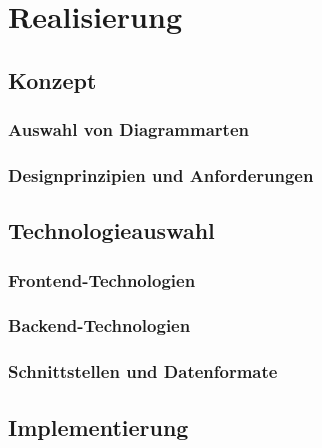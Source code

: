 
\chapter{Realisierung}

\section{Konzept}
\subsection{Auswahl von Diagrammarten}
\subsection{Designprinzipien und Anforderungen}

\section{Technologieauswahl}
\subsection{Frontend-Technologien}
\subsection{Backend-Technologien}
\subsection{Schnittstellen und Datenformate}

\section{Implementierung}

